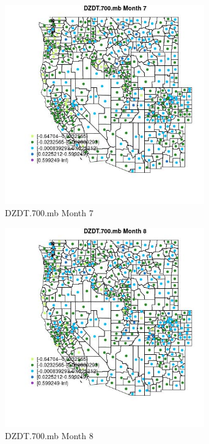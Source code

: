 \begin{figure} 
\centering  
\includegraphics[width=0.77\textwidth]{Code_Outputs/df_report_ML_predictors_CountyCentroid_Locations_Dates_2008-01-01to2018-12-31_MapObsMo7DZDT700mb.jpg} 
\caption{\label{fig:df_report_ML_predictors_CountyCentroid_Locations_Dates_2008-01-01to2018-12-31MapObsMo7DZDT700mb}DZDT.700.mb Month 7} 
\end{figure} 
 

\begin{figure} 
\centering  
\includegraphics[width=0.77\textwidth]{Code_Outputs/df_report_ML_predictors_CountyCentroid_Locations_Dates_2008-01-01to2018-12-31_MapObsMo8DZDT700mb.jpg} 
\caption{\label{fig:df_report_ML_predictors_CountyCentroid_Locations_Dates_2008-01-01to2018-12-31MapObsMo8DZDT700mb}DZDT.700.mb Month 8} 
\end{figure} 
 

